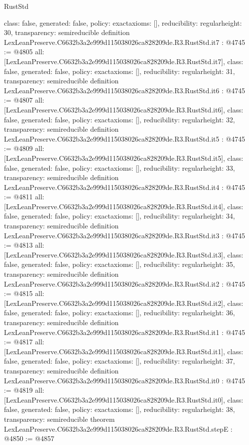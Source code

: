 \begin{lexlean}{RustStd}
\begin{coremodule}
{  class: false,
  generated: false,
  policy: exact{axioms: []},
  reducibility: regular{height: 30},
  transparency: semireducible
}
definition LexLeanPreserve.C6632b3a2e999d115038026ca828209de.R3.RustStd.it7 : @4745 := @4805 {
  all: [LexLeanPreserve.C6632b3a2e999d115038026ca828209de.R3.RustStd.it7],
  class: false,
  generated: false,
  policy: exact{axioms: []},
  reducibility: regular{height: 31},
  transparency: semireducible
}
definition LexLeanPreserve.C6632b3a2e999d115038026ca828209de.R3.RustStd.it6 : @4745 := @4807 {
  all: [LexLeanPreserve.C6632b3a2e999d115038026ca828209de.R3.RustStd.it6],
  class: false,
  generated: false,
  policy: exact{axioms: []},
  reducibility: regular{height: 32},
  transparency: semireducible
}
definition LexLeanPreserve.C6632b3a2e999d115038026ca828209de.R3.RustStd.it5 : @4745 := @4809 {
  all: [LexLeanPreserve.C6632b3a2e999d115038026ca828209de.R3.RustStd.it5],
  class: false,
  generated: false,
  policy: exact{axioms: []},
  reducibility: regular{height: 33},
  transparency: semireducible
}
definition LexLeanPreserve.C6632b3a2e999d115038026ca828209de.R3.RustStd.it4 : @4745 := @4811 {
  all: [LexLeanPreserve.C6632b3a2e999d115038026ca828209de.R3.RustStd.it4],
  class: false,
  generated: false,
  policy: exact{axioms: []},
  reducibility: regular{height: 34},
  transparency: semireducible
}
definition LexLeanPreserve.C6632b3a2e999d115038026ca828209de.R3.RustStd.it3 : @4745 := @4813 {
  all: [LexLeanPreserve.C6632b3a2e999d115038026ca828209de.R3.RustStd.it3],
  class: false,
  generated: false,
  policy: exact{axioms: []},
  reducibility: regular{height: 35},
  transparency: semireducible
}
definition LexLeanPreserve.C6632b3a2e999d115038026ca828209de.R3.RustStd.it2 : @4745 := @4815 {
  all: [LexLeanPreserve.C6632b3a2e999d115038026ca828209de.R3.RustStd.it2],
  class: false,
  generated: false,
  policy: exact{axioms: []},
  reducibility: regular{height: 36},
  transparency: semireducible
}
definition LexLeanPreserve.C6632b3a2e999d115038026ca828209de.R3.RustStd.it1 : @4745 := @4817 {
  all: [LexLeanPreserve.C6632b3a2e999d115038026ca828209de.R3.RustStd.it1],
  class: false,
  generated: false,
  policy: exact{axioms: []},
  reducibility: regular{height: 37},
  transparency: semireducible
}
definition LexLeanPreserve.C6632b3a2e999d115038026ca828209de.R3.RustStd.it0 : @4745 := @4819 {
  all: [LexLeanPreserve.C6632b3a2e999d115038026ca828209de.R3.RustStd.it0],
  class: false,
  generated: false,
  policy: exact{axioms: []},
  reducibility: regular{height: 38},
  transparency: semireducible
}
theorem LexLeanPreserve.C6632b3a2e999d115038026ca828209de.R3.RustStd.stepE : @4850 := @4857 {
}
\end{coremodule}
\end{lexlean}
